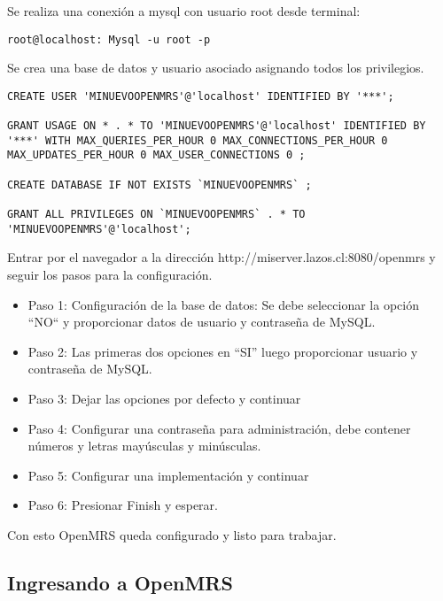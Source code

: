 Se realiza una conexión a mysql con usuario root desde terminal:

\lstset{language=sh}
\begin{lstlisting}
root@localhost: Mysql -u root -p
\end{lstlisting}

Se crea una base de datos y usuario asociado asignando todos los privilegios.


\lstset{language=SQL}
\begin{lstlisting}
CREATE USER 'MINUEVOOPENMRS'@'localhost' IDENTIFIED BY '***';

GRANT USAGE ON * . * TO 'MINUEVOOPENMRS'@'localhost' IDENTIFIED BY '***' WITH MAX_QUERIES_PER_HOUR 0 MAX_CONNECTIONS_PER_HOUR 0 MAX_UPDATES_PER_HOUR 0 MAX_USER_CONNECTIONS 0 ;

CREATE DATABASE IF NOT EXISTS `MINUEVOOPENMRS` ;

GRANT ALL PRIVILEGES ON `MINUEVOOPENMRS` . * TO 'MINUEVOOPENMRS'@'localhost';
\end{lstlisting}

Entrar por el navegador a la dirección http://miserver.lazos.cl:8080/openmrs y seguir los  pasos para la configuración.

\begin{itemize}
 \item Paso 1: Configuración de la base de datos: Se debe seleccionar la opción ``NO`` y proporcionar datos de usuario y contraseña de MySQL.

  \item Paso 2: Las primeras dos opciones en “SI” luego proporcionar usuario y contraseña de MySQL.

  \item Paso 3: Dejar las opciones por defecto y continuar

  \item Paso 4: Configurar una contraseña para administración, debe contener números y letras mayúsculas y minúsculas.

  \item Paso 5: Configurar una implementación y continuar

  \item Paso 6: Presionar Finish y esperar.
\end{itemize}


Con esto  OpenMRS queda configurado y listo para trabajar.

\subsection{Ingresando a OpenMRS}

